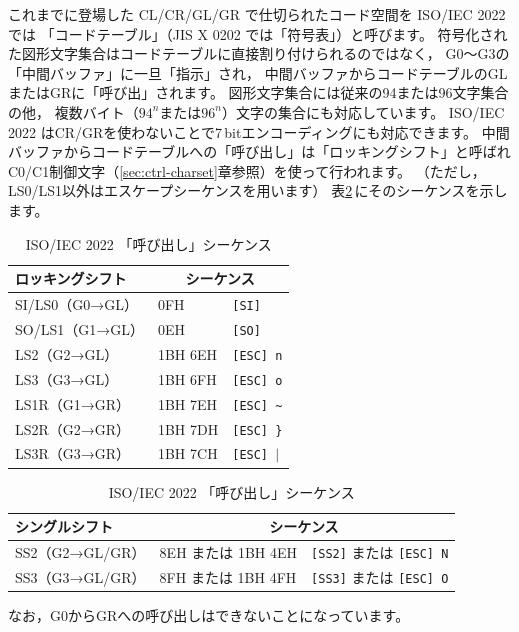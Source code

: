 \documentclass[a4j,10pt,fleqn]{jsarticle}
\begin{document}
これまでに登場した CL/CR/GL/GR で仕切られたコード空間を ISO/IEC 2022 では
「コードテーブル」（JIS X 0202 では「符号表」）と呼びます。
符号化された図形文字集合はコードテーブルに直接割り付けられるのではなく，
G0～G3の「中間バッファ」に一旦「指示」され，
中間バッファからコードテーブルのGLまたはGRに「呼び出」されます。
図形文字集合には従来の94または96文字集合の他，
複数バイト（$94^{n}$または$96^{n}$）文字の集合にも対応しています。
ISO/IEC 2022 はCR/GRを使わないことで7\,bitエンコーディングにも対応できます。
中間バッファからコードテーブルへの「呼び出し」は「ロッキングシフト」と呼ばれ
C0/C1制御文字（\ref{sec:ctrl-charset}章参照）を使って行われます。
（ただし，LS0/LS1以外はエスケープシーケンスを用います）
表\ref{tbl:ISO2022-shift}\,にそのシーケンスを示します。
\begin{table}[htp]
\begin{center}\begin{tabular}{|l|l|l|}
    \hline
    ロッキングシフト & \multicolumn{2}{c|}{シーケンス} \\ \hline
    \hline
    SI/LS0（G0→GL） & 0FH      & \texttt{[SI]} \\ \hline
    SO/LS1（G1→GL） & 0EH      & \texttt{[SO]} \\ \hline
    LS2（G2→GL）    & 1BH 6EH  & \texttt{[ESC] n} \\ \hline
    LS3（G3→GL）    & 1BH 6FH  & \texttt{[ESC] o} \\ \hline
    LS1R（G1→GR）   & 1BH 7EH  & \texttt{[ESC] \~{}} \\ \hline
    LS2R（G2→GR）   & 1BH 7DH  & \texttt{[ESC] \}} \\ \hline
    LS3R（G3→GR）   & 1BH 7CH  & \texttt{[ESC] $|$} \\ \hline
\end{tabular}\end{center}
\begin{center}\begin{tabular}{|l|l|l|}
    \hline
    シングルシフト   & \multicolumn{2}{c|}{シーケンス} \\ \hline
    \hline
    SS2（G2→GL/GR） & 8EH または 1BH 4EH  & \texttt{[SS2]} または \texttt{[ESC] N} \\ \hline
    SS3（G3→GL/GR） & 8FH または 1BH 4FH  & \texttt{[SS3]} または \texttt{[ESC] O} \\ \hline
\end{tabular}\end{center}
\caption{ISO/IEC 2022 「呼び出し」シーケンス}\label{tbl:ISO2022-shift}
\end{table}%
なお，G0からGRへの呼び出しはできないことになっています。
\end{document}
